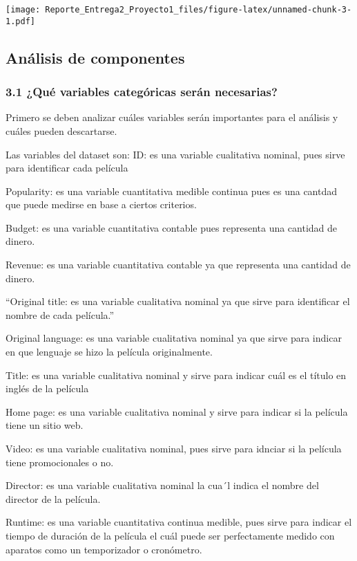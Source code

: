 \documentclass[
]{article}
\begin{document}
\texttt{[image: Reporte\_Entrega2\_Proyecto1\_files/figure-latex/unnamed-chunk-3-1.pdf]}

\subsection{Análisis de componentes}\label{anuxe1lisis-de-componentes}

\subsubsection{3.1 ¿Qué variables categóricas serán
necesarias?}\label{quuxe9-variables-categuxf3ricas-seruxe1n-necesarias}

Primero se deben analizar cuáles variables serán importantes para el
análisis y cuáles pueden descartarse.

Las variables del dataset son: ID: es una variable cualitativa nominal,
pues sirve para identificar cada película

Popularity: es una variable cuantitativa medible continua pues es una
cantdad que puede medirse en base a ciertos criterios.

Budget: es una variable cuantitativa contable pues representa una
cantidad de dinero.

Revenue: es una variable cuantitativa contable ya que representa una
cantidad de dinero.

``Original title: es una variable cualitativa nominal ya que sirve para
identificar el nombre de cada película.''

Original language: es una variable cualitativa nominal ya que sirve para
indicar en que lenguaje se hizo la película originalmente.

Title: es una variable cualitativa nominal y sirve para indicar cuál es
el título en inglés de la película

Home page: es una variable cualitativa nominal y sirve para indicar si
la película tiene un sitio web.

Video: es una variable cualitativa nominal, pues sirve para idnciar si
la película tiene promocionales o no.

Director: es una variable cualitativa nominal la cua´l indica el nombre
del director de la película.

Runtime: es una variable cuantitativa continua medible, pues sirve para
indicar el tiempo de duración de la película el cuál puede ser
perfectamente medido con aparatos como un temporizador o cronómetro.
\end{document}
